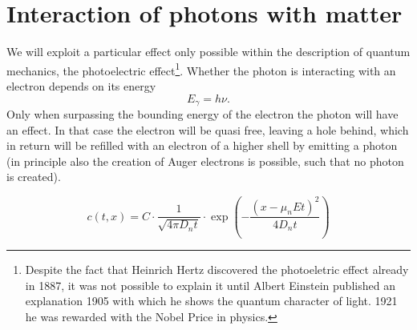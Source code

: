 \section{Interaction of photons with matter}
We will exploit a particular effect only possible within the description of quantum mechanics, the
photoelectric effect\footnote{Despite the fact that Heinrich Hertz discovered the 
photoeletric effect already in 1887, it was not possible to explain it until Albert Einstein
published an explanation 1905 with which he shows the quantum character
of light. 1921 he was rewarded with the Nobel Price in physics.}. 
Whether the photon is interacting with an electron depends on its energy
\begin{equation}
    E_\gamma = h \nu.
\end{equation}
Only when surpassing the bounding energy of the electron the photon will have an effect. In that
case the electron will be quasi free, leaving a hole behind, which in return will be refilled with
an electron of a higher shell by emitting a photon (in principle also the creation of Auger electrons is
possible, such that no photon is created). 




\begin{equation}
    c(t, x) = C \cdot \frac{1}{\sqrt{4 \pi D_n t}} 
    \cdot \exp\left( -\frac{\left( x - \mu_n E t \right)^2}{4 D_n t} \right)
    \label{eq:c_t_x}
\end{equation}

